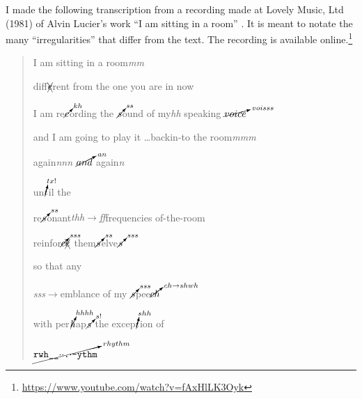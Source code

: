 I made the following transcription from a recording made at Lovely Music, Ltd (1981) of Alvin Lucier's work ``I am sitting in a room'' \parencite{Luc70:Iam}. It is meant to notate the many ``irregularities'' that differ from the text. The recording is available online.\footnote{\url{https://www.youtube.com/watch?v=fAxHlLK3Oyk}} 
\begin{quote}
\small
I am sitting in a room\textit{mm}\par
diff$\xcancel{e}$rent from the one you are in now\par
{}
I am re$\cancelto{kh}{c}$ording the $\cancelto{ss}{s}$ound of my\textit{hh} speaking $\cancelto{voisss}{voice}$ \par
{}
and I am going to play it \dots backin-to the room\textit{mmm} \par
again\textit{nnn} $\cancelto{an}{and}$  again\textit{n} \par
{}
un$\cancelto{tx!}{t}$il the\par
re$\cancelto{ss}{s}$onant\textit{thh$\rightarrow$ff}frequencies of-the-room\par
{}
reinfor$\cancelto{sss}{c}\xcancel{e}$ them$\cancelto{ss}{s}$elve$\cancelto{sss}{s}$\par
{}
so that any \par
\textit{{\small s}ss}$\rightarrow$emblance of my $\cancelto{sss}{s}$pee$\cancelto{ch\rightarrow shwh}{ch}$\par
{}
with per$\cancelto{hhhh}{h}$ap$\cancelto{s!}{s}$ the excep$\cancelto{shh}{t}$ion of\par
$\cancelto{rhythm}{\texttt{rwh\_\_$\cdot\cdot$.$\cdot$-ythm}}$



\end{quote}
